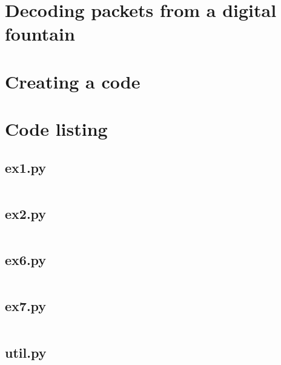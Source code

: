\documentclass[10pt,a4paper,twoside,twocolumn]{article}
\begin{document}
\section{Decoding packets from a digital fountain}\label{sec:ex7}
\section{Creating a code}\label{sec:ex8}


\onecolumn
\appendixpage
\appendix

\section{Code listing}

\subsection{ex1.py}\label{app:ex1}
\inputminted{python}{../src/ex1.py}

\subsection{ex2.py}\label{app:ex2}
\inputminted{python}{../src/ex2.py}

\subsection{ex6.py}\label{app:ex6}
\inputminted{python}{../src/ex6.py}

\subsection{ex7.py}\label{app:ex7}
\inputminted{python}{../src/ex7.py}

\subsection{util.py}\label{app:util}
\inputminted{python}{../src/util.py}
\end{document}
